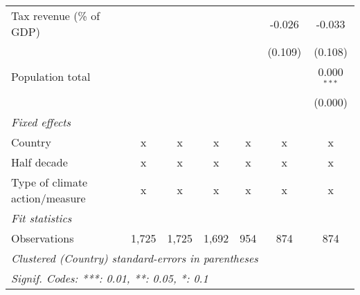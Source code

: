 \begin{tabular}{lcccccc}
   Tax revenue (\% of GDP)                       &              &              &         &              & -0.026       & -0.033\\   
                                                 &              &              &         &              & (0.109)      & (0.108)\\   
   Population total                              &              &              &         &              &              & 0.000$^{***}$\\   
                                                 &              &              &         &              &              & (0.000)\\   
   \emph{Fixed effects}\\
   Country                                       & x            & x            & x       & x            & x            & x\\  
   Half decade                                   & x            & x            & x       & x            & x            & x\\  
   Type of climate action/measure                & x            & x            & x       & x            & x            & x\\  
   \midrule \emph{Fit statistics}\\
   Observations                                  & 1,725        & 1,725        & 1,692   & 954          & 874          & 874\\  
   \midrule
   \multicolumn{7}{l}{\emph{Clustered (Country) standard-errors in parentheses}}\\
   \multicolumn{7}{l}{\emph{Signif. Codes: ***: 0.01, **: 0.05, *: 0.1}}\\
\end{tabular}
\par\endgroup


